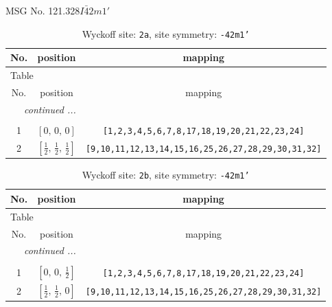 \documentclass[fleqn,8pt]{jsarticle}
\begin{document}
\setcounter{MaxMatrixCols}{32}

\renewcommand{\tablename}{Table~}
\renewcommand{\figurename}{Figure~}
\begin{center}
\LARGE
MSG No. 121.328\quad$I\bar{4}2m1'$
\end{center}
\renewcommand{\arraystretch}{1.2}
\begin{longtable}{ccc}
\caption{Wyckoff site: {\tt 2a}, site symmetry: {\tt -42m1'}}
 \\
 \hline \hline
No. & position & mapping \\ \hline \endfirsthead

\multicolumn{2}{l}{\tablename\ \thetable{}} \\
 \hline \hline
No. & position & mapping \\ \hline \endhead

 \hline \hline
\multicolumn{2}{r}{\footnotesize\it continued ...} \\ \endfoot

 \hline \hline
\multicolumn{2}{r}{} \\ \endlastfoot

1 & $\left[ 0,\, 0,\, 0 \right]$ & {\tt [1,2,3,4,5,6,7,8,17,18,19,20,21,22,23,24]} \\ \hline
2 & $\left[ \frac{1}{2},\, \frac{1}{2},\, \frac{1}{2} \right]$ & {\tt [9,10,11,12,13,14,15,16,25,26,27,28,29,30,31,32]} \\
\end{longtable}
\renewcommand{\arraystretch}{1.2}
\begin{longtable}{ccc}
\caption{Wyckoff site: {\tt 2b}, site symmetry: {\tt -42m1'}}
 \\
 \hline \hline
No. & position & mapping \\ \hline \endfirsthead

\multicolumn{2}{l}{\tablename\ \thetable{}} \\
 \hline \hline
No. & position & mapping \\ \hline \endhead

 \hline \hline
\multicolumn{2}{r}{\footnotesize\it continued ...} \\ \endfoot

 \hline \hline
\multicolumn{2}{r}{} \\ \endlastfoot

1 & $\left[ 0,\, 0,\, \frac{1}{2} \right]$ & {\tt [1,2,3,4,5,6,7,8,17,18,19,20,21,22,23,24]} \\ \hline
2 & $\left[ \frac{1}{2},\, \frac{1}{2},\, 0 \right]$ & {\tt [9,10,11,12,13,14,15,16,25,26,27,28,29,30,31,32]} \\
\end{longtable}
\end{document}
